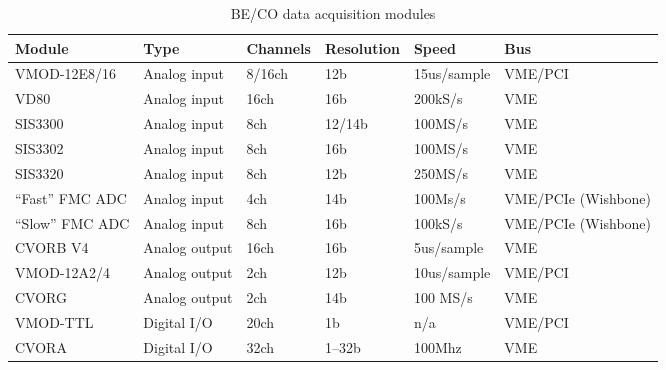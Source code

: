 \documentclass{JAC2003}
\begin{document}
\begin{table*}[ht]
   \centering
   \caption{BE/CO data acquisition modules}
   \begin{tabular}{llllll}
       \toprule
	\textbf{Module}& \textbf{Type}& \textbf{Channels}& 
	\textbf{Resolution}& \textbf{Speed}& \textbf{Bus} \\ 
       \midrule
	VMOD-12E8/16    &  Analog input  & 8/16ch & 12b    & 15us/sample & VME/PCI  \\
	VD80            &  Analog input  & 16ch   & 16b    & 200kS/s     & VME  \\
	SIS3300         &  Analog input  & 8ch    & 12/14b & 100MS/s     & VME  \\
	SIS3302         &  Analog input  & 8ch    & 16b    & 100MS/s     & VME  \\
	SIS3320         &  Analog input  & 8ch    & 12b    & 250MS/s     & VME  \\
	``Fast'' FMC ADC&  Analog input  & 4ch    & 14b    & 100Ms/s     & VME/PCIe (Wishbone)  \\
	``Slow'' FMC ADC&  Analog input  & 8ch    & 16b    & 100kS/s     & VME/PCIe (Wishbone)  \\
       \midrule
	CVORB V4        &  Analog output & 16ch   &  16b   &  5us/sample & VME 	 \\
	VMOD-12A2/4     &  Analog output & 2ch    &  12b   &  10us/sample& VME/PCI \\
	CVORG           &  Analog output & 2ch    &  14b   &  100 MS/s   & VME  \\
       \midrule
	VMOD-TTL        &  Digital I/O   & 20ch   & 1b     & n/a         & VME/PCI \\
	CVORA           &  Digital I/O   & 32ch   & 1--32b & 100Mhz	 & VME \\
       \bottomrule
   \end{tabular}
   \label{zio-modules}
\end{table*}
\end{document}
